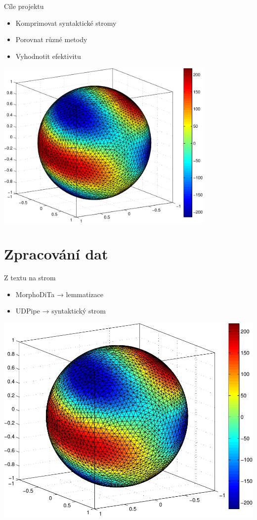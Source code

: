 \documentclass[lualatex,hyperref={pdfencoding=auto}]{beamer}
\begin{document}
\begin{frame}{Cíle projektu}
\begin{itemize}
  \item Komprimovat syntaktické stromy
  \item Porovnat různé metody
  \item Vyhodnotit efektivitu
\end{itemize}
\includegraphics[width=0.8\textwidth]{fig/sphere_mix_real.pdf}
\end{frame}

\section{Zpracování dat}
\begin{frame}{Z textu na strom}
\begin{itemize}
  \item MorphoDiTa → lemmatizace
  \item UDPipe → syntaktický strom
\end{itemize}
\includegraphics[width=\textwidth]{fig/sphere_mix_real.pdf}
\end{frame}
\end{document}
